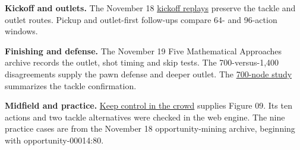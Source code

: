 \documentclass[11pt,letterpaper]{article}
\newcommand{\subtopic}[1]{\par\vspace{2mm}{\sffamily\large\bfseries #1\par}\vspace{-1mm}}
\begin{document}
\subtopic{Evidence notes}
{\footnotesize\RaggedRight
\textbf{Kickoff and outlets.} The November 18 \href{https://github.com/yuanrui3/Football-chess/tree/c2bb5c39835b2367ad75abbcba884bc80c2a11d0/docs/tactical-kickoff-tackle-replay-2026-11-18}{kickoff replays} preserve the tackle and outlet routes. Pickup and outlet-first follow-ups compare 64- and 96-action windows.

\textbf{Finishing and defense.} The November 19 Five Mathematical Approaches archive records the outlet, shot timing and skip tests. The 700-versus-1,400 disagreements supply the pawn defense and deeper outlet. The \href{https://github.com/yuanrui3/Football-chess/blob/7be2b4e508e8e878bab9827977a9b104c7b7c016/docs/tactical-goal-ray-cache-2026-11-21/README.md}{700-node study} summarizes the tackle confirmation.

\textbf{Midfield and practice.} \href{https://github.com/yuanrui3/Football-chess/blob/45fc3f4a43f2775c1eaf6e27737ef4aba76a7403/dist/exercise-midfield.js#L57}{Keep control in the crowd} supplies Figure 09. Its ten actions and two tackle alternatives were checked in the web engine. The nine practice cases are from the November 18 opportunity-mining archive, beginning with \textsf{opportunity-00014:80}.\par}
\end{document}
